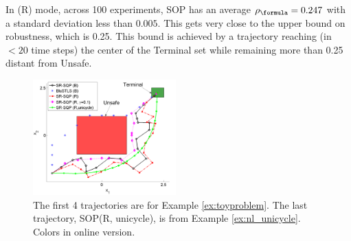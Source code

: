 \begin{exmp}
In (R) mode, across 100 experiments, SOP has an average $\rob_{\formula}=0.247$ with a standard deviation less than $0.005$. 
This gets very close to the upper bound on robustness, which is 0.25.
This bound is achieved by a trajectory reaching (in $<20$ time steps) the center of the Terminal set while remaining more than 0.25 distant from Unsafe. 
\end{exmp}

\begin{figure}[t]
\centering
\includegraphics[width=0.49\textwidth]{figures/ToyExUni_alternate_scissored.pdf}
\vspace{-20pt}
\caption{{\small The first 4 trajectories are for Example \ref{ex:toyproblem}. The last trajectory, SOP(R, unicycle), is from Example \ref{ex:nl_unicycle}. Colors in online version.}}
\label{fig:toy control}
\vspace{-10pt}
\end{figure}


